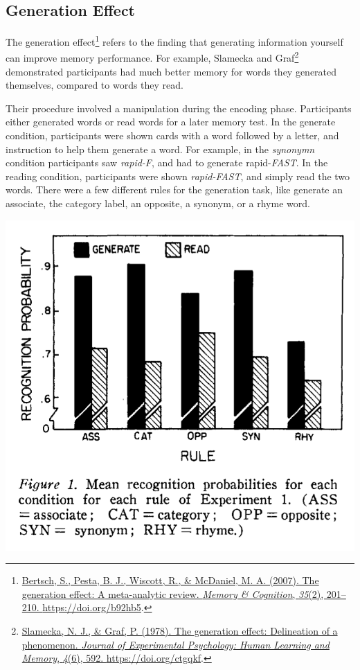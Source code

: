 \documentclass[
  oneside,
  12pt]{crumpbook}
\newenvironment{floatright50}{%
  \wrapfigure{R}{.5\textwidth}%
  }{%
  \endwrapfigure}
\begin{document}
\hypertarget{generation-effect}{%
\subsection{Generation Effect}\label{generation-effect}}

The generation effect\footnote{\protect\hyperlink{ref-bertschGenerationEffectMetaanalytic2007}{Bertsch, S., Pesta, B. J., Wiscott, R., \& McDaniel, M. A. (2007). The generation effect: {A} meta-analytic review. \emph{Memory \& Cognition}, \emph{35}(2), 201--210. \url{https://doi.org/b92hb5}}.} refers to the finding that generating information yourself can improve memory performance. For example, Slamecka and Graf\footnote{\protect\hyperlink{ref-slameckaGenerationEffectDelineation1978a}{Slamecka, N. J., \& Graf, P. (1978). The generation effect: {Delineation} of a phenomenon. \emph{Journal of Experimental Psychology: Human Learning and Memory}, \emph{4}(6), 592. \url{https://doi.org/ctgqkf}}.} demonstrated participants had much better memory for words they generated themselves, compared to words they read.

Their procedure involved a manipulation during the encoding phase. Participants either generated words or read words for a later memory test. In the generate condition, participants were shown cards with a word followed by a letter, and instruction to help them generate a word. For example, in the \emph{synonymn} condition participants saw \emph{rapid-F}, and had to generate rapid-\emph{FAST}. In the reading condition, participants were shown \emph{rapid-FAST}, and simply read the two words. There were a few different rules for the generation task, like generate an associate, the category label, an opposite, a synonym, or a rhyme word.

\begin{floatright50}
\includegraphics[width=1\linewidth]{imgs/Generation_effect}

\end{floatright50}
\end{document}
